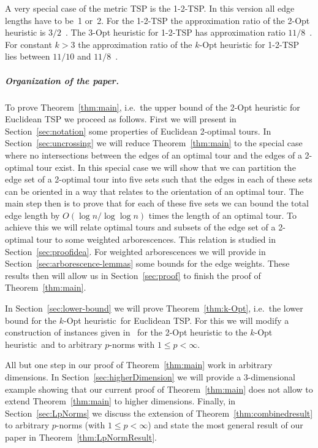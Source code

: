 \documentclass[a4paper, 11pt]{article}
\def\kopt{$k$-Opt heuristic}
\def\blue#1{#1}
\begin{document}
A very special case of the metric TSP is the 1-2-TSP. In this version all edge lengths
have to be~1 or~2. For the 1-2-TSP the approximation ratio of the 2-Opt heuristic is $3/2$~\cite{KMSV1998}.
The $3$-Opt heuristic for 1-2-TSP has approximation ratio $11/8$~\cite{Zho2021}. For constant $k>3$ 
the approximation ratio of the $k$-Opt heuristic for 1-2-TSP lies between $11/10$ and $11/8$~\cite{Zho2020}.




\subparagraph*{Organization of the paper.}
To prove Theorem~\ref{thm:main}, i.e.\ the upper bound of the 2-Opt heuristic for Euclidean TSP we proceed as follows. 
First we will present in Section~\ref{sec:notation} some properties of Euclidean 2-optimal tours. 
In Section~\ref{sec:uncrossing} we will \blue{reduce} Theorem~\ref{thm:main} to the special case 
where no intersections between the edges of an optimal tour and the edges of a 2-optimal tour exist. 
In this special case we will show that we can partition the edge set of a 2-optimal tour into five sets 
\blue{such that the edges in each of these sets can be oriented in a way that relates to the orientation of}
an optimal tour. The main step then is to prove that for each of these five sets we can bound the total edge length by 
$O(\log n / \log \log n)$ times the length of an optimal tour. 
To achieve this we will relate optimal tours and subsets of the edge set of a 2-optimal tour to some weighted arborescences. 
This relation is studied in Section~\ref{sec:proofidea}.
For weighted arborescences we will provide in Section~\ref{sec:arborescence-lemmas} some bounds for the edge weights. 
These results then will allow us in Section~\ref{sec:proof} to finish the proof of Theorem~\ref{thm:main}.

In Section~\ref{sec:lower-bound} we will prove Theorem~\ref{thm:k-Opt}, i.e.\ the lower bound for the \kopt\ for
Euclidean TSP. 
For this we will modify a construction of instances given in~\cite{CKT1999} for the 2-Opt heuristic to the \kopt\ and to arbitrary $p$-norms
\blue{with $1\le p < \infty$}. 

All but one step in our proof of Theorem~\ref{thm:main} work in arbitrary dimensions. In Section~\ref{sec:higherDimension}
we will provide a 3-dimensional example showing that our current proof \blue{of Theorem~\ref{thm:main}} does not allow to extend \blue{Theorem~\ref{thm:main}}
to higher dimensions. Finally, in Section~\ref{sec:LpNorms} we discuss the extension of \blue{Theorem~\ref{thm:combinedresult}} to
arbitrary $p$-norms \blue{(with $1\le p < \infty$)} and state the most general result of our paper in Theorem~\ref{thm:LpNormResult}. 
\end{document}
